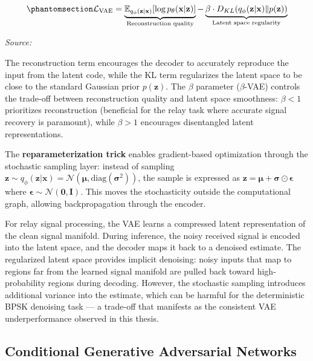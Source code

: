 \begin{equation}\protect\phantomsection\label{eq:vae-loss}{\mathcal{L}_{\text{VAE}} = \underbrace{\mathbb{E}_{q_\phi(\mathbf{z}|\mathbf{x})}[\log p_\theta(\mathbf{x}|\mathbf{z})]}_{\text{Reconstruction quality}} - \underbrace{\beta \cdot D_{KL}(q_\phi(\mathbf{z}|\mathbf{x}) \| p(\mathbf{z}))}_{\text{Latent space regularity}}
}\end{equation} \par{\small\textit{Source: \cite{kingma2014auto}}}

The reconstruction term encourages the decoder to accurately reproduce the input from the latent code, while the KL term regularizes the latent space to be close to the standard Gaussian prior \(p(\mathbf{z})\). The \(\beta\) parameter (\(\beta\)-VAE) \cite{higgins2017beta} controls the trade-off between reconstruction quality and latent space smoothness: \(\beta < 1\) prioritizes reconstruction (beneficial for the relay task where accurate signal recovery is paramount), while \(\beta > 1\) encourages disentangled latent representations.

The \textbf{reparameterization trick} enables gradient-based optimization through the stochastic sampling layer: instead of sampling \(\mathbf{z} \sim q_\phi(\mathbf{z} | \mathbf{x}) = \mathcal{N}(\boldsymbol{\mu}, \text{diag}(\boldsymbol{\sigma}^2))\), the sample is expressed as \(\mathbf{z} = \boldsymbol{\mu} + \boldsymbol{\sigma} \odot \boldsymbol{\epsilon}\) where \(\boldsymbol{\epsilon} \sim \mathcal{N}(\mathbf{0}, \mathbf{I})\). This moves the stochasticity outside the computational graph, allowing backpropagation through the encoder.

For relay signal processing, the VAE learns a compressed latent representation of the clean signal manifold. During inference, the noisy received signal is encoded into the latent space, and the decoder maps it back to a denoised estimate. The regularized latent space provides implicit denoising: noisy inputs that map to regions far from the learned signal manifold are pulled back toward high-probability regions during decoding. However, the stochastic sampling introduces additional variance into the estimate, which can be harmful for the deterministic BPSK denoising task --- a trade-off that manifests as the consistent VAE underperformance observed in this thesis.

\subsection{Conditional Generative Adversarial Networks}\label{sec:conditional-generative-adversarial-networks}

